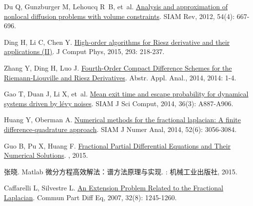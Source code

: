 \begin{thebibliography}{79}
    Du Q, Gunzburger M, Lehoucq R~B, et~al.
    \newblock \href{https://doi.org/10.1137/110833294}{Analysis and approximation of nonlocal diffusion problems with volume constraints}\allowbreak[J].
    \newblock SIAM Rev, 2012, 54\allowbreak (4): 667-696.
    
    Ding H, Li C, Chen Y.
    \newblock \href{https://www.sciencedirect.com/science/article/pii/S0021999114004148}{High-order algorithms for {{Riesz}} derivative and their applications ({{II}})}\allowbreak[J].
    \newblock J Comput Phys, 2015, 293: 218-237.
    
    Zhang Y, Ding H, Luo J.
    \newblock \href{http://www.hindawi.com/journals/aaa/2014/540692/}{Fourth-{{Order Compact Difference Schemes}} for the {{Riemann-Liouville}} and {{Riesz Derivatives}}}\allowbreak[J].
    \newblock Abstr. Appl. Anal., 2014, 2014: 1-4.
    
    Gao T, Duan J, Li X, et~al.
    \newblock \href{https://doi.org/10.1137/120897262}{Mean exit time and escape probability for dynamical systems driven by l{\'e}vy noises}\allowbreak[J].
    \newblock SIAM J Sci Comput, 2014, 36\allowbreak (3): A887-A906.
    
    Huang Y, Oberman A.
    \newblock \href{https://doi.org/10.1137/140954040}{Numerical methods for the fractional laplacian: {{A}} finite difference-quadrature approach}\allowbreak[J].
    \newblock SIAM J Numer Anal, 2014, 52\allowbreak (6): 3056-3084.
    
    Guo B, Pu X, Huang F.
    \newblock \href{https://www.worldscientific.com/worldscibooks/10.1142/9543}{{Fractional Partial Differential Equations and Their Numerical Solutions}}\allowbreak[M].
    , 2015.
    
    {张晓}.
    \newblock Matlab 微分方程高效解法：谱方法原理与实现\allowbreak[M].
    : {机械工业出版社}, 2015.
    
    Caffarelli L, Silvestre L.
    \newblock \href{http://www.tandfonline.com/doi/abs/10.1080/03605300600987306}{An {{Extension Problem Related}} to the {{Fractional Laplacian}}}\allowbreak[J].
    \newblock Commun Part Diff Eq, 2007, 32\allowbreak (8): 1245-1260.
    

\end{thebibliography}
